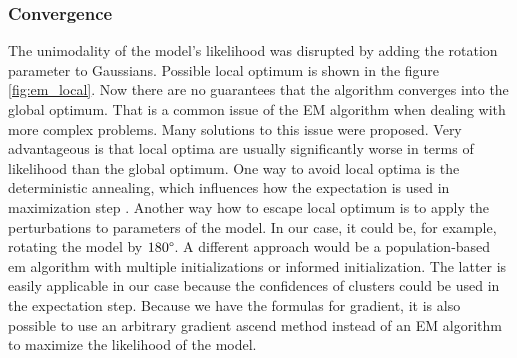 \subsubsection{Convergence}
The unimodality of the model's likelihood was disrupted by adding the rotation parameter to Gaussians. Possible local optimum is shown in the figure \ref{fig:em_local}. Now there are no guarantees that the algorithm converges into the global optimum. That is a common issue of the EM algorithm when dealing with more complex problems. Many solutions to this issue were proposed. Very advantageous is that local optima are usually significantly worse in terms of likelihood than the global optimum. One way to avoid local optima is the deterministic annealing, which influences how the expectation is used in maximization step \cite{ueda1998}. Another way how to escape local optimum is to apply the perturbations to parameters of the model. In our case, it could be, for example, rotating the model by $180\degree$. A different approach would be a population-based em algorithm with multiple initializations or informed initialization. The latter is easily applicable in our case because the confidences of clusters could be used in the expectation step. Because we have the formulas for gradient, it is also possible to use an arbitrary gradient ascend method instead of an EM algorithm to maximize the likelihood of the model.

